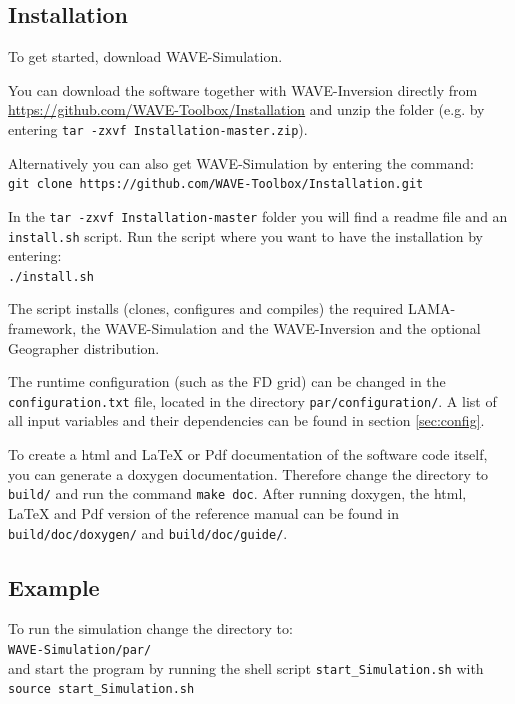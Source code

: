 \documentclass[pdftex,a4paper,parskip,listof=totoc,bibliography=totoc,onehalfspacing,12pt]{scrreprt}
\newcommand{\shellcmd}[1]{\indent\indent\texttt{#1}}	%
\newcommand{\shellcmdline}[1]{\indent\indent\texttt{\quad#1}} 	%
\begin{document}
\subsection{Installation}
To get started, download WAVE-Simulation. 

You can download the software together with WAVE-Inversion directly from \url{https://github.com/WAVE-Toolbox/Installation} and unzip the folder (e.g. by entering \shellcmd{tar -zxvf Installation-master.zip}).

Alternatively you can also get WAVE-Simulation by entering the command: \\\shellcmdline{git clone https://github.com/WAVE-Toolbox/Installation.git}

In the \shellcmd{tar -zxvf Installation-master} folder you will find a readme file and an \shellcmd{install.sh} script. Run the script where you want to have the installation by entering: \\\shellcmdline{./install.sh}

The script installs (clones, configures and compiles) the required LAMA-framework, the WAVE-Simulation and the WAVE-Inversion and the optional Geographer distribution.

The runtime configuration (such as the FD grid) can be changed in the \shellcmd{configuration.txt} file, located in the directory \shellcmd{par/configuration/}. A list of all input variables and their dependencies can be found in section \ref{sec:config}. 

To create a html and LaTeX or Pdf documentation of the software code itself, you can generate a doxygen documentation. Therefore change the directory to \shellcmd{build/} and run the command \shellcmd{make doc}. After running doxygen, the html, LaTeX and Pdf version of the reference manual can be found in \shellcmd{build/doc/doxygen/} and \shellcmd{build/doc/guide/}.

\subsection{Example}

To run the simulation change the directory to: \\\shellcmdline{WAVE-Simulation/par/}\\
and start the program by running the shell script \shellcmd{start\_Simulation.sh} with  \\\shellcmdline{source start\_Simulation.sh}\\
\end{document}
